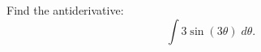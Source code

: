 \documentclass{ximera}
\author{Emma Smith Zbarsky}
\begin{document}
\begin{exercise}

Find the antiderivative: \[\int 3\sin(3\theta)\; d\theta.\]

\begin{multipleChoice}
\end{multipleChoice}

\end{exercise}
\end{document}
